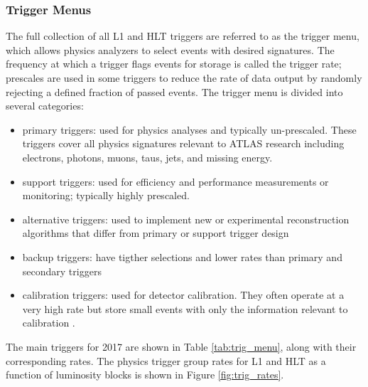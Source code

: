 \subsubsection{Trigger Menus}
The full collection of all L1 and HLT triggers are referred to as the trigger menu, which allows physics analyzers to select events with desired signatures. The frequency at which a trigger flags events for storage is called the trigger rate; prescales are used in some triggers to reduce the rate of data output by randomly rejecting a defined fraction of passed events. The trigger menu is divided into several categories:
\begin{itemize}
    \item primary triggers: used for physics analyses and typically un-prescaled. These triggers cover all physics signatures relevant to ATLAS research including electrons, photons, muons, taus, jets, and missing energy.
    \item support triggers: used for efficiency and performance measurements or monitoring; typically highly prescaled.
    \item alternative triggers: used to implement new or experimental reconstruction algorithms that differ from primary or support trigger design
    \item backup triggers: have tigther selections and lower rates than primary and secondary triggers
    \item calibration triggers: used for detector calibration. They often operate at a very high rate but store small events with only the information relevant to calibration \cite{trig_2015}.
\end{itemize}
The main triggers for 2017 are shown in Table \ref{tab:trig_menu}, along with their corresponding rates. The physics trigger group rates for L1 and HLT as a function of luminosity blocks is shown in Figure \ref{fig:trig_rates}.


